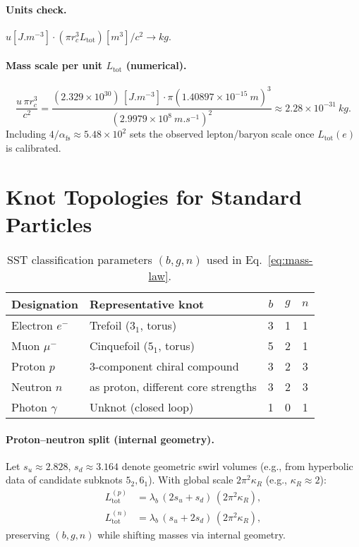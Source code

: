 \documentclass[10pt,reprint,aps,onecolumn,nofootinbib]{revtex4-2}
\newcommand{\rc}{r_c}
\begin{document}
\paragraph*{Units check.} \(u[\si{J.m^{-3}}]\cdot(\pi \rc^3 L_{\text{tot}})[\si{m^3}]/c^2\to \si{kg}\).
\paragraph*{Mass scale per unit \(L_{\text{tot}}\) (numerical).}
\[
\frac{u\,\pi\rc^3}{c^2}
=
\frac{(2.329\times 10^{30})\,[\si{J.m^{-3}}]\cdot \pi(1.40897\times 10^{-15}\ \si{m})^{3}}{(2.9979\times 10^{8}\ \si{m.s^{-1}})^{2}}
\approx 2.28\times 10^{-31}\ \si{kg}.
\]
Including \(4/\alpha_{\mathrm{fs}}\approx 5.48\times 10^{2}\) sets the observed lepton/baryon scale once \(L_{\text{tot}}(e)\) is calibrated.

\section*{Knot Topologies for Standard Particles}
\begin{table}[h]
\centering
\begin{tabular}{@{}llccc@{}}
\toprule
Designation & Representative knot & \(b\) & \(g\) & \(n\) \\
\midrule
Electron \(e^-\) & Trefoil (\(3_1\), torus) & 3 & 1 & 1 \\
Muon \(\mu^-\) & Cinquefoil (\(5_1\), torus) & 5 & 2 & 1 \\
Proton \(p\) & 3-component chiral compound & 3 & 2 & 3 \\
Neutron \(n\) & as proton, different core strengths & 3 & 2 & 3 \\
Photon \(\gamma\) & Unknot (closed loop) & 1 & 0 & 1 \\
\bottomrule
\end{tabular}
\caption{SST classification parameters \((b,g,n)\) used in Eq.~\eqref{eq:mass-law}.}
\label{tab:sst-classes}
\end{table}

\paragraph*{Proton–neutron split (internal geometry).}
Let \(s_u\approx 2.828\), \(s_d\approx 3.164\) denote geometric swirl volumes (e.g., from hyperbolic data of candidate subknots \(5_2,6_1\)). With global scale \(2\pi^2\kappa_R\) (e.g., \(\kappa_R\!\approx\!2\)):
\begin{align*}
L_{\text{tot}}^{(p)} &= \lambda_b\,(2s_u+s_d)\,(2\pi^2\kappa_R),\\
L_{\text{tot}}^{(n)} &= \lambda_b\,(s_u+2s_d)\,(2\pi^2\kappa_R),
\end{align*}
preserving \((b,g,n)\) while shifting masses via internal geometry.
\end{document}
